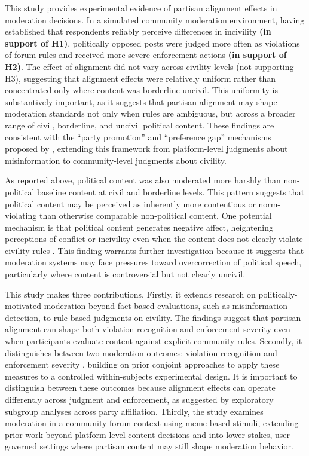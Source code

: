 \documentclass[12pt]{article}
\begin{document}
This study provides experimental evidence of partisan alignment effects in moderation decisions. In a simulated community moderation environment, having established that respondents reliably perceive differences in incivility \textbf{(in support of H1)}, politically opposed posts were judged more often as violations of forum rules and received more severe enforcement actions \textbf{(in support of H2)}. The effect of alignment did not vary across civility levels (not supporting H3), suggesting that alignment effects were relatively uniform rather than concentrated only where content was borderline uncivil. This uniformity is substantively important, as it suggests that partisan alignment may shape moderation standards not only when rules are ambiguous, but across a broader range of civil, borderline, and uncivil political content. These findings are consistent with the \enquote{party promotion} and \enquote{preference gap} mechanisms proposed by \textcite{appelPartisanConflictContent2023a}, extending this framework from platform-level judgments about misinformation to community-level judgments about civility.

As reported above, political content was also moderated more harshly than non-political baseline content at civil and borderline levels. This pattern suggests that political content may be perceived as inherently more contentious or norm-violating than otherwise comparable non-political content. One potential mechanism is that political content generates negative affect, heightening perceptions of conflict or incivility even when the content does not clearly violate civility rules \parencite{mutzInYourFacePoliticsConsequences2015}. This finding warrants further investigation because it suggests that moderation systems may face pressures toward overcorrection of political speech, particularly where content is controversial but not clearly uncivil.

This study makes three contributions. Firstly, it extends research on politically-motivated moderation beyond fact-based evaluations, such as misinformation detection, to rule-based judgments on civility. The findings suggest that partisan alignment can shape both violation recognition and enforcement severity even when participants evaluate content against explicit community rules. Secondly, it distinguishes between two moderation outcomes: violation recognition and enforcement severity \parencite{kozyrevaResolvingContentModeration2023,solomonIllusoryInterpartyDisagreement2024}, building on prior conjoint approaches to apply these measures to a controlled within-subjects experimental design. It is important to distinguish between these outcomes because alignment effects can operate differently across judgment and enforcement, as suggested by exploratory subgroup analyses across party affiliation. Thirdly, the study examines moderation in a community forum context using meme-based stimuli, extending prior work beyond platform-level content decisions and into lower-stakes, user-governed settings where partisan content may still shape moderation behavior.
\end{document}
